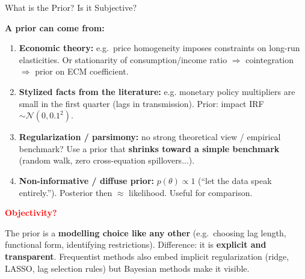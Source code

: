 \documentclass{beamer}
\begin{document}
\begin{frame}{What is the Prior? Is it Subjective?}
\small

\textbf{A prior can come from:}
\begin{enumerate}
  \item \textbf{Economic theory:} e.g.\ price homogeneity imposes constraints on long-run elasticities. Or stationarity of consumption/income ratio $\Rightarrow$ cointegration $\Rightarrow$ prior on ECM coefficient.
  \item \textbf{Stylized facts from the literature:} e.g. monetary policy multipliers are small in the first quarter (lags in transmission). Prior: impact IRF $\sim \mathcal{N}(0, 0.1^2)$.
  \item \textbf{Regularization / parsimony:} no strong theoretical view / empirical benchmark? Use a prior that \textbf{shrinks toward a simple benchmark} (random walk, zero cross-equation spillovers...).
  \item \textbf{Non-informative / diffuse prior:} $p(\theta) \propto 1$ (``let the data speak entirely.''). Posterior then $\approx$ likelihood. Useful for comparison.
\end{enumerate}

\pause
\medskip
\textcolor{red}{\textbf{Objectivity?}}
\medskip

The prior is a \textbf{modelling choice like any other} (e.g.\ choosing lag length, functional form, identifying restrictions). Difference: it is \textbf{explicit and transparent}. Frequentist methods
also embed implicit regularization (ridge, LASSO, lag selection rules) but Bayesian methods make it visible.


\end{frame}
\end{document}
